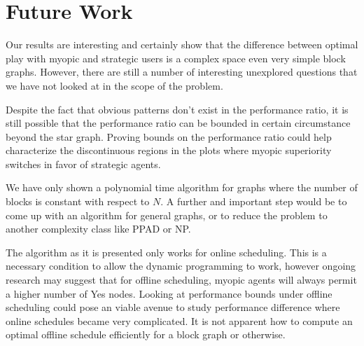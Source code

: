 \documentclass{article}
\begin{document}
\section{Future Work}

Our results are interesting and certainly show that the difference
between optimal play with myopic and strategic users is a complex
space even very simple block graphs. However, there are still a number
of interesting unexplored questions that we have not looked at in the
scope of the problem.

Despite the fact that obvious patterns don't exist in the performance
ratio, it is still possible that the performance ratio can be bounded
in certain circumstance beyond the star graph. Proving bounds on the
performance ratio could help characterize the discontinuous regions in
the plots where myopic superiority switches in favor of strategic
agents.

We have only shown a polynomial time algorithm for graphs where the
number of blocks is constant with respect to $N$. A further and
important step would be to come up with an algorithm for general
graphs, or to reduce the problem to another complexity class like PPAD
or NP.

The algorithm as it is presented only works for online
scheduling. This is a necessary condition to allow the dynamic
programming to work, however ongoing research may suggest that for
offline scheduling, myopic agents will always permit a higher number
of Yes nodes. Looking at performance bounds under offline scheduling
could pose an viable avenue to study performance difference where
online schedules became very complicated. It is not apparent how to
compute an optimal offline schedule efficiently for a block graph or
otherwise.



\end{document}
